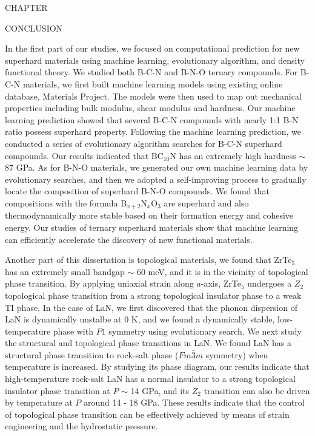 	{\centering
		\vspace{0pt} \hspace{0pt} \par
	}
	{\centering
		\vspace{56pt} CHAPTER  \the\value{numch}
	}
	{\centering\singlespacing
		CONCLUSION
	    \par
	}
	{\centering
		\vspace{0pt} \hspace{0pt} \par
	}
	
In the first part of our studies, we focused on computational prediction for new superhard materials using machine learning, evolutionary algorithm, and density functional theory. We studied both B-C-N and B-N-O ternary compounds. For B-C-N materials, we first built machine learning models using existing online database, Materials Project. The models were then used to map out mechanical properties including bulk modulus, shear modulus and hardness. Our machine learning prediction showed that several B-C-N compounds with nearly 1:1 B-N ratio possess superhard property. Following the machine learning prediction, we conducted a series of evolutionary algorithm searches for B-C-N superhard compounds. Our results indicated that BC$_{10}$N has an extremely high hardness $\sim$ 87 GPa. As for B-N-O materials, we generated our own machine learning data by evolutionary searches, and then we adopted a self-improving process to gradually locate the composition of superhard B-N-O compounds. We found that compositions with the formula B$_{x+2}$N$_{x}$O$_{3}$ are superhard and also thermodynamically more stable based on their formation energy and cohesive energy. Our studies of ternary superhard materials show that machine learning can efficiently accelerate the discovery of new functional materials.

Another part of this dissertation is topological materials, we found that ZrTe$_5$ has an extremely small bandgap $\sim$ 60 meV, and it is in the vicinity of topological phase transition. By applying uniaxial strain along $a$-axis, ZrTe$_5$ undergoes a $Z_2$ topological phase transition from a strong topological insulator phase to a weak TI phase. In the case of LaN, we first discovered that the phonon dispersion of LaN is dynamically unstalbe at 0 K, and we found a dynamically stable, low-temperature phase with $P1$ symmetry using evolutionary search. We next study the structural and topological phase transitions in LaN. We found LaN has a structural phase transition to rock-salt phase ($Fm\bar{3}m$ symmetry) when temperature is increased. By studying its phase diagram, our results indicate that high-temperature rock-salt LaN has a normal insulator to a strong topological insulator phase transition at $P$ $\sim$ 14 GPa, and its $Z_2$ transition can also be driven by temperature at $P$ around 14 - 18 GPa. These results indicate that the control of topological phase transition can be effectively achieved by means of strain engineering and the hydrostatic pressure.
	

